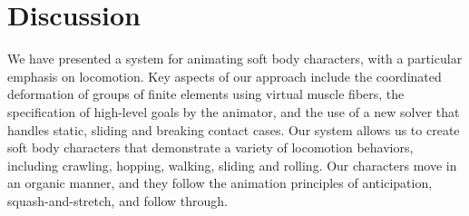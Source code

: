 \section{Discussion}
\label{sec:Evaluation}

We have presented a system for animating soft body characters, with a
particular emphasis on locomotion.  Key aspects of our approach include
the coordinated deformation of groups of finite elements using virtual
muscle fibers, the specification of high-level goals by the animator, and
the use of a new solver that handles static, sliding and breaking contact
cases.  Our system allows us to create soft body characters that
demonstrate a variety of locomotion behaviors, including crawling,
hopping, walking, sliding and rolling.  Our characters move in an organic
manner, and they follow the animation principles of anticipation,
squash-and-stretch, and follow through.

